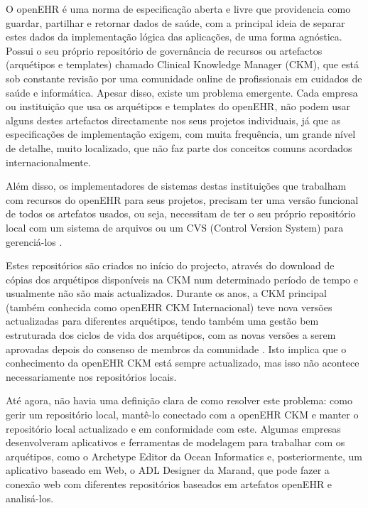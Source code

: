\documentclass[mim_thesis.tex]{subfiles}
\begin{document}
O openEHR é uma norma de especificação aberta e livre que providencia como guardar, partilhar e retornar dados de saúde, com a principal ideia de separar estes dados da implementação lógica das aplicações, de uma forma agnóstica. Possui o seu próprio repositório de governância de recursos ou artefactos (arquétipos e templates) chamado Clinical Knowledge Manager (CKM), que está sob constante revisão por uma comunidade online de profissionais em cuidados de saúde e informática. Apesar disso, existe um problema emergente. Cada empresa ou instituição que usa os arquétipos e templates do openEHR, não podem usar alguns destes artefactos directamente nos seus projetos individuais, já que as especificações de implementação exigem, com muita frequência, um grande nível de detalhe, muito localizado, que não faz parte dos conceitos comuns acordados internacionalmente.

Além disso, os implementadores de sistemas destas instituições que trabalham com recursos do openEHR para seus projetos, precisam ter uma versão funcional de todos os artefatos usados, ou seja, necessitam de ter o seu próprio repositório local com um sistema de arquivos ou um CVS (Control Version System) para gerenciá-los .

Estes repositórios são criados no início do projecto, através do download de cópias dos arquétipos disponíveis na CKM num determinado período de tempo e usualmente não são mais actualizados. Durante os anos, a CKM principal (também conhecida como openEHR CKM Internacional) teve nova versões actualizadas para diferentes arquétipos, tendo também uma gestão bem estruturada dos ciclos de vida dos arquétipos, com as novas versões a serem aprovadas depois do consenso de membros da comunidade \citep{Leslie2017}. Isto implica que o conhecimento da openEHR CKM está sempre actualizado, mas isso não acontece necessariamente nos repositórios locais.

Até agora, não havia uma definição clara de como resolver este problema: como gerir um repositório local, mantê-lo conectado com a openEHR CKM e manter o repositório local actualizado e em conformidade com este. Algumas empresas desenvolveram aplicativos e ferramentas de modelagem para trabalhar com os arquétipos, como o Archetype Editor da Ocean Informatics e, posteriormente, um aplicativo baseado em Web, o ADL Designer da Marand, que pode fazer a conexão web com diferentes repositórios baseados em artefatos openEHR e analisá-los.
\end{document}
